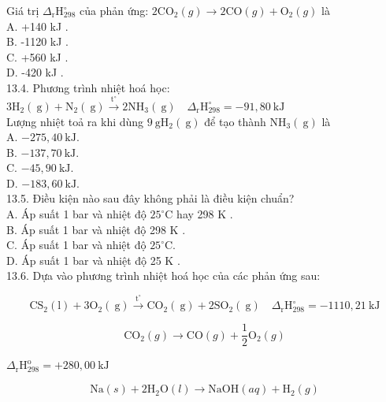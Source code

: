 \documentclass[10pt]{article}
\begin{document}
Giá trị $\Delta_{\mathrm{r}} \mathrm{H}_{298}^{\circ}$ của phản ứng: $2 \mathrm{CO}_{2}(g) \rightarrow 2 \mathrm{CO}(g)+\mathrm{O}_{2}(g)$ là\\
A. +140 kJ .\\
B. -1120 kJ .\\
C. +560 kJ .\\
D. -420 kJ .\\
13.4. Phương trình nhiệt hoá học:\\
$3 \mathrm{H}_{2}(\mathrm{~g})+\mathrm{N}_{2}(\mathrm{~g}) \xrightarrow{\mathrm{t}^{\circ}} 2 \mathrm{NH}_{3}(\mathrm{~g}) \quad \Delta_{\mathrm{r}} \mathrm{H}_{298}^{\circ}=-91,80 \mathrm{~kJ}$\\
Lượng nhiệt toả ra khi dùng $9 \mathrm{~g} \mathrm{H}_{2}(\mathrm{~g})$ để tạo thành $\mathrm{NH}_{3}(\mathrm{~g})$ là\\
A. $-275,40 \mathrm{~kJ}$.\\
B. $-137,70 \mathrm{~kJ}$.\\
C. $-45,90 \mathrm{~kJ}$.\\
D. $-183,60 \mathrm{~kJ}$.\\
13.5. Điều kiện nào sau đây không phải là điều kiện chuẩn?\\
A. Áp suất 1 bar và nhiệt độ $25^{\circ} \mathrm{C}$ hay 298 K .\\
B. Áp suất 1 bar và nhiệt độ 298 K .\\
C. Áp suất 1 bar và nhiệt độ $25^{\circ} \mathrm{C}$.\\
D. Áp suất 1 bar và nhiệt độ 25 K .\\
13.6. Dựa vào phương trình nhiệt hoá học của các phản ứng sau:


\begin{equation*}
\mathrm{CS}_{2}(\mathrm{l})+3 \mathrm{O}_{2}(\mathrm{~g}) \xrightarrow{\mathrm{t}^{\circ}} \mathrm{CO}_{2}(\mathrm{~g})+2 \mathrm{SO}_{2}(\mathrm{~g}) \quad \Delta_{\mathrm{r}} \mathrm{H}_{298}^{\circ}=-1110,21 \mathrm{~kJ} \tag{1}
\end{equation*}



\begin{equation*}
\mathrm{CO}_{2}(g) \rightarrow \mathrm{CO}(g)+\frac{1}{2} \mathrm{O}_{2}(g) \tag{2}
\end{equation*}


$\Delta_{\mathrm{r}} \mathrm{H}_{298}^{\mathrm{o}}=+280,00 \mathrm{~kJ}$


\begin{equation*}
\mathrm{Na}(s)+2 \mathrm{H}_{2} \mathrm{O}(l) \rightarrow \mathrm{NaOH}(a q)+\mathrm{H}_{2}(g) \tag{3}
\end{equation*}
\end{document}
